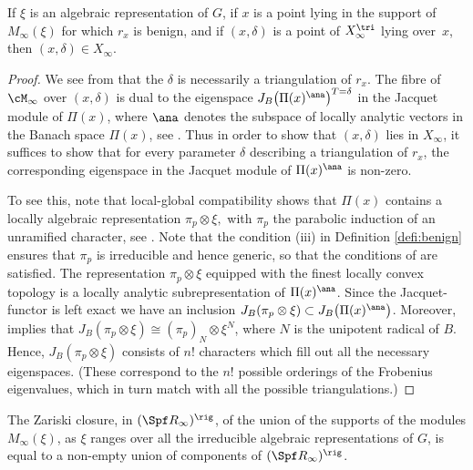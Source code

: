 \begin{lem}
\label{lem:refinements}
If $\xi$ is an algebraic representation of $G$,
if $x$ is a point lying in the support of $M_{\infty}(\xi)$ for which
$r_x$ is benign, and if $(x,\delta)$ is a point of $X_{\infty}^{\tri}$
lying over~$x$, then $(x,\delta) \in X_{\infty}$.
\end{lem}

\begin{proof}
We see from \cite[Cor.\,2.12]{BHS} that the $\delta$ is necessarily
a triangulation of $r_x$.
The fibre of $\cM_{\infty}$ over $(x,\delta)$ is dual to the eigenspace
$J_B\bigl(\Pi(x)^{\ana}\bigr)^{T = \delta}$ in the Jacquet module of $\Pi(x)$, where $\ana$ denotes the subspace
of locally analytic vectors in the Banach space $\Pi(x)$, see \cite[Prop.\,3.7]{BHS}.
Thus in order to show that $(x,\delta)$ lies in $X_{\infty}$,
it suffices to show that for every parameter $\delta$ describing
a triangulation of $r_x$, the corresponding eigenspace in the Jacquet
module of $\Pi(x)^{\ana}$ is non-zero.\enlargethispage{\baselineskip}%

To see this, note that local-global compatibility shows that $\Pi(x)$
contains a locally algebraic representation $\pi_p \otimes \xi,$
with $\pi_p$ the parabolic induction of an unramified character, see \cite[Th.\,4.35]{six-authors}. Note that the condition (iii) in Definition
\ref{defi:benign} ensures that $\pi_p$ is irreducible and hence generic, so that the conditions of \cite[Th.\,4.35]{six-authors} are satisfied.
The representation $\pi_p \otimes \xi$ equipped with the finest locally convex topology is a locally analytic subrepresentation
of $\Pi(x)^{\ana}$. Since the Jacquet-functor is left exact we have an inclusion $J_B(\pi_p \otimes \xi)\subset J_B\bigl(\Pi(x)^{\ana}\bigr)$.
Moreover, \cite[Prop.\,4.3.6]{Jacquet-one} implies that $J_B(\pi_p \otimes \xi)\cong (\pi_p)_N \otimes \xi^N$, where $N$ is the unipotent radical
of $B$. Hence, $J_B(\pi_p\otimes\xi)$ consists of $n!$ characters which fill out
all the necessary eigenspaces. (These correspond to the $n!$ possible
orderings of the Frobenius eigenvalues, which in turn
match with all the possible triangulations.)
\end{proof}

\begin{thm}
The Zariski closure, in $(\Spf R_{\infty})^{\rig}$, of the
union of the supports of the modules $M_{\infty}(\xi)$,
as $\xi$ ranges over all the irreducible algebraic representations
of $G$, is equal to a non-empty union of components
of $(\Spf R_{\infty})^{\rig}$.
\end{thm}

